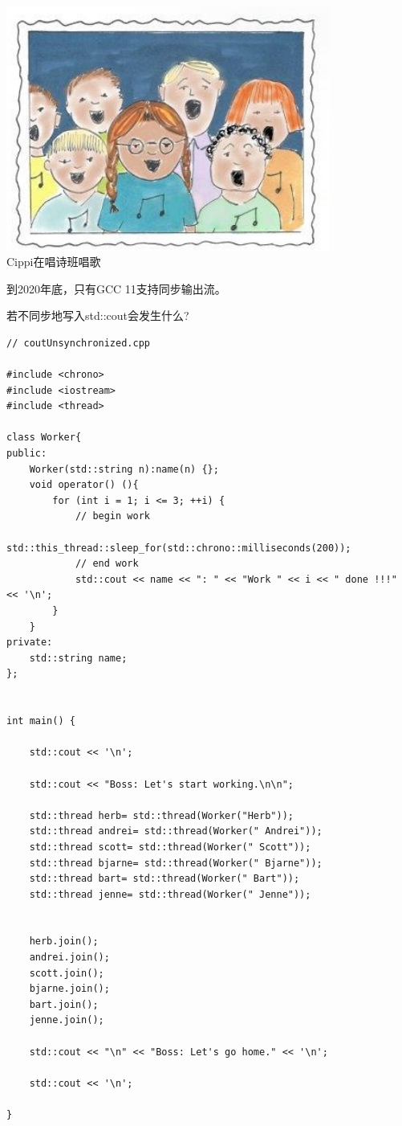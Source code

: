 \begin{center}
\includegraphics[width=0.8\textwidth]{content/3/chapter6/images/28.png}\\
Cippi在唱诗班唱歌
\end{center}


\begin{tcolorbox}[breakable,enhanced jigsaw,colback=blue!5!white,colframe=blue!75!black,title={编译器对同步输出流的支持}]
	
到2020年底，只有GCC 11支持同步输出流。
	
\end{tcolorbox}

若不同步地写入std::cout会发生什么?

\begin{lstlisting}[style=styleCXX]
// coutUnsynchronized.cpp

#include <chrono>
#include <iostream>
#include <thread>

class Worker{
public:
	Worker(std::string n):name(n) {};
	void operator() (){
		for (int i = 1; i <= 3; ++i) {
			// begin work
			std::this_thread::sleep_for(std::chrono::milliseconds(200));
			// end work
			std::cout << name << ": " << "Work " << i << " done !!!" << '\n';
		}
	}
private:
	std::string name;
};


int main() {

	std::cout << '\n';
	
	std::cout << "Boss: Let's start working.\n\n";
	
	std::thread herb= std::thread(Worker("Herb"));
	std::thread andrei= std::thread(Worker(" Andrei"));
	std::thread scott= std::thread(Worker(" Scott"));
	std::thread bjarne= std::thread(Worker(" Bjarne"));
	std::thread bart= std::thread(Worker(" Bart"));
	std::thread jenne= std::thread(Worker(" Jenne"));
	
	
	herb.join();
	andrei.join();
	scott.join();
	bjarne.join();
	bart.join();
	jenne.join();
	
	std::cout << "\n" << "Boss: Let's go home." << '\n';
	
	std::cout << '\n';

}
\end{lstlisting}

